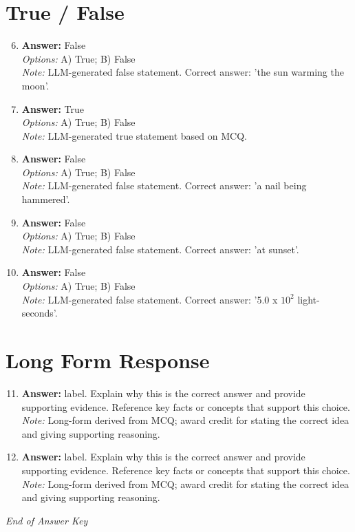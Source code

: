 \documentclass[12pt]{article}
\begin{document}
\section*{True / False}
\begin{enumerate}[label=\arabic*.]
\setcounter{enumi}{5}
\item \textbf{Answer:} False
\\ \textit{Options:} A) True; B) False
\\ \textit{Note:} LLM-generated false statement. Correct answer: 'the sun warming the moon'.
\item \textbf{Answer:} True
\\ \textit{Options:} A) True; B) False
\\ \textit{Note:} LLM-generated true statement based on MCQ.
\item \textbf{Answer:} False
\\ \textit{Options:} A) True; B) False
\\ \textit{Note:} LLM-generated false statement. Correct answer: 'a nail being hammered'.
\item \textbf{Answer:} False
\\ \textit{Options:} A) True; B) False
\\ \textit{Note:} LLM-generated false statement. Correct answer: 'at sunset'.
\item \textbf{Answer:} False
\\ \textit{Options:} A) True; B) False
\\ \textit{Note:} LLM-generated false statement. Correct answer: '5.0 x $10^2$ light-seconds'.
\end{enumerate}

\section*{Long Form Response}
\begin{enumerate}[label=\arabic*.]
\setcounter{enumi}{10}
\item \textbf{Answer:} label. Explain why this is the correct answer and provide supporting evidence. Reference key facts or concepts that support this choice.
\\ \textit{Note:} Long-form derived from MCQ; award credit for stating the correct idea and giving supporting reasoning.
\item \textbf{Answer:} label. Explain why this is the correct answer and provide supporting evidence. Reference key facts or concepts that support this choice.
\\ \textit{Note:} Long-form derived from MCQ; award credit for stating the correct idea and giving supporting reasoning.
\end{enumerate}

\vfill
\noindent\textit{End of Answer Key}
\end{document}
